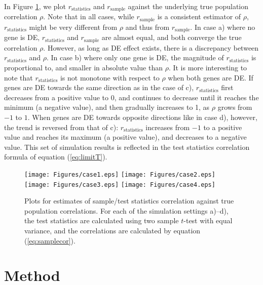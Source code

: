 \documentclass[12pt, a4paper]{article}
\begin{document}
	In Figure \ref{fig:tstat}, we plot $r_\text{statistics}$ and $r_{\text{sample}}$ against the underlying true population correlation $\rho$. Note that in all cases, while $r_{\text{sample}}$ is a consistent estimator of $\rho$, $r_\text{statistics}$ might be very different from $\rho$ and thus from $r_\text{sample}$.  
	In case a) where no gene is DE, $r_\text{statistics}$ and $r_{\text{sample}}$ are almost equal, and both converge the true correlation $\rho$. However, as long as DE effect exists, there is a discrepancy between $r_\text{statistics}$ and $\rho$. In case b) where only one gene is DE, 
	 the magnitude of $r_\text{statistics}$ is proportional to, and smaller in absolute value than $\rho$.
	It is more interesting to note that $r_\text{statistics}$ is not monotone with respect to $\rho$ when both genes are DE. If genes are DE towards the same direction as in the case of c),  $r_\text{statistics}$ first decreases from a positive value to 0, and continues to decrease until it reaches the minimum (a negative value), and then gradually increases to 1, as $\rho$ grows from $-1$ to $1$. When genes are DE towards opposite directions like in case d), however, the trend is reversed from that of c): $r_\text{statistics}$ increases from $-1$ to a positive value and reaches its maximum (a positive value), and decreases to a negative value. This set of simulation results is reflected in the test statistics correlation formula of equation (\ref{eq:limitT}). 
	
	\begin{figure}[!ht]
		\centering
		\texttt{[image: Figures/case1.eps]}
		\texttt{[image: Figures/case2.eps]}
		\texttt{[image: Figures/case3.eps]}
		\texttt{[image: Figures/case4.eps]}
	\caption{Plots for estimates of sample/test statistics correlation against true population correlations. For each of the simulation settings a)--d), the test statistics are calculated using two sample $t$-test with equal variance, and the correlations are calculated by equation (\ref{eq:samplecor}). }
		\label{fig:tstat}
	\end{figure}

	
	
	
	
	
	\section{Method}\label{section:testcormethod}
	
\end{document}

